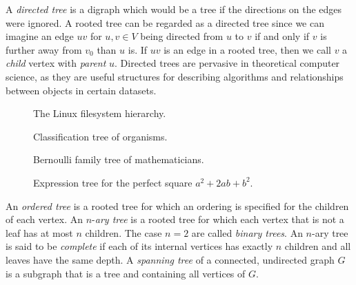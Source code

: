 A \emph{directed tree} is a
digraph which would be a tree if the directions on the
edges were ignored. A rooted tree can be regarded
as a directed tree since we can imagine an edge
$uv$ for $u,v \in V$ being directed from $u$ to $v$ if and only if $v$ is
further away from $v_0$ than $u$ is. If $uv$ is an edge in a
rooted tree, then we call $v$ a
\emph{child} vertex with
\emph{parent} $u$. Directed
trees are pervasive in theoretical computer science, as they are
useful structures for describing algorithms and relationships between
objects in certain datasets.

\begin{figure}[!htbp]
\centering
{}

\caption{The Linux filesystem hierarchy.}
\label{fig:trees_forests:filesystem_hierarchy}
\end{figure}

\begin{figure}[!htbp]
\centering
{}

\caption{Classification tree of organisms.}
\label{fig:trees_forests:classification_tree_organisms}
\end{figure}

\begin{figure}[!htbp]
\centering
{}

\caption{Bernoulli family tree of mathematicians.}
\label{fig:trees_forests:Bernoulli_family_tree}
\end{figure}

\begin{figure}[!htbp]
\centering
{}

\caption{Expression tree for the perfect square $a^2 + 2ab + b^2$.}
\label{fig:trees_forests:expression_tree_perfect_square}
\end{figure}

An \emph{ordered tree} is a
rooted tree for which an ordering is specified for
the children of each vertex. An
$n$-\emph{ary tree} is a rooted tree for which
each vertex that is not a leaf has at most $n$
children. The case $n = 2$ are called
\emph{binary trees}. An $n$-ary
tree is said to be \emph{complete} if each of its
internal vertices has exactly $n$
children and all leaves have
the same depth. A
\emph{spanning tree} of a connected, undirected
graph $G$ is a subgraph that is a tree and containing all vertices of
$G$.

